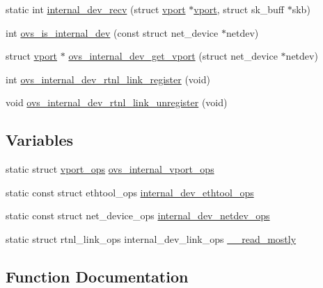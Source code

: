 \begin{DoxyCompactItemize}
\item 
static int \hyperlink{vport-internal__dev_8c_a259b00fb99d12379c06cf2b9d2de6050}{internal\+\_\+dev\+\_\+recv} (struct \hyperlink{structvport}{vport} $\ast$\hyperlink{structvport}{vport}, struct sk\+\_\+buff $\ast$skb)
\item 
int \hyperlink{vport-internal__dev_8c_a2056d15823f88a4caeb90001bce724bb}{ovs\+\_\+is\+\_\+internal\+\_\+dev} (const struct net\+\_\+device $\ast$netdev)
\item 
struct \hyperlink{structvport}{vport} $\ast$ \hyperlink{vport-internal__dev_8c_abdb7a75d6c79176507a41a200c69e77b}{ovs\+\_\+internal\+\_\+dev\+\_\+get\+\_\+vport} (struct net\+\_\+device $\ast$netdev)
\item 
int \hyperlink{vport-internal__dev_8c_ac6d8a2dd3cdef9e9ba9efdd4e0656f7c}{ovs\+\_\+internal\+\_\+dev\+\_\+rtnl\+\_\+link\+\_\+register} (void)
\item 
void \hyperlink{vport-internal__dev_8c_a4e61a8459847af3c4f5773e09552cf98}{ovs\+\_\+internal\+\_\+dev\+\_\+rtnl\+\_\+link\+\_\+unregister} (void)
\end{DoxyCompactItemize}
\subsection*{Variables}
\begin{DoxyCompactItemize}
\item 
static struct \hyperlink{structvport__ops}{vport\+\_\+ops} \hyperlink{vport-internal__dev_8c_a20321257f6991e7ffb535947c382401e}{ovs\+\_\+internal\+\_\+vport\+\_\+ops}
\item 
static const struct ethtool\+\_\+ops \hyperlink{vport-internal__dev_8c_aa2c816d0e5a964778079cefc6d9f2c13}{internal\+\_\+dev\+\_\+ethtool\+\_\+ops}
\item 
static const struct net\+\_\+device\+\_\+ops \hyperlink{vport-internal__dev_8c_af6e4b8260f029c8e987281b6e9890b8e}{internal\+\_\+dev\+\_\+netdev\+\_\+ops}
\item 
static struct rtnl\+\_\+link\+\_\+ops internal\+\_\+dev\+\_\+link\+\_\+ops \hyperlink{vport-internal__dev_8c_a8e42f895d19142ac43bdcfedf9271120}{\+\_\+\+\_\+read\+\_\+mostly}
\end{DoxyCompactItemize}


\subsection{Function Documentation}
\hypertarget{vport-internal__dev_8c_a63afed52200efd997d360e90a6a8bd11}{}
